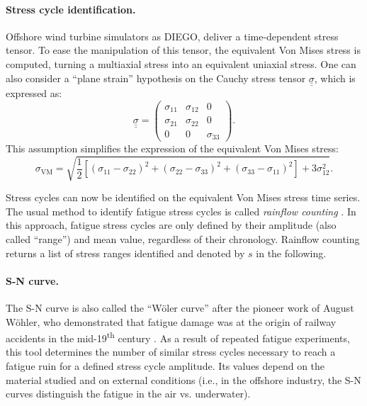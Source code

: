 \paragraph{Stress cycle identification.}
Offshore wind turbine simulators as DIEGO, deliver a time-dependent stress tensor. 
To ease the manipulation of this tensor, the equivalent Von Mises stress is computed, turning a multiaxial stress into an equivalent uniaxial stress. 
One can also consider a ``plane strain'' hypothesis on the Cauchy stress tensor $\underline{\underline{\sigma}}$, which is expressed as:
\begin{equation}
    \underline{\underline{\sigma}} = \begin{pmatrix}
                            \sigma_{11} & \sigma_{12} & 0\\
                            \sigma_{21} & \sigma_{22} & 0\\
                            0 & 0 & \sigma_{33}
                            \end{pmatrix}.
\end{equation}
This assumption simplifies the expression of the equivalent Von Mises stress: 
\begin{equation}
    \sigma _{\mathrm{VM}}=\sqrt{{\frac {1}{2}}\left[(\sigma _{11}-\sigma _{22})^{2}+(\sigma _{22}-\sigma _{33})^{2}+(\sigma _{33}-\sigma _{11})^{2}\right] + 3 \sigma _{12}^{2}}.
\end{equation}

Stress cycles can now be identified on the equivalent Von Mises stress time series. 
The usual method to identify fatigue stress cycles is called \textit{rainflow counting} \citep{dowling_1972}. 
In this approach, fatigue stress cycles are only defined by their amplitude (also called ``range'') and mean value, regardless of their chronology. 
Rainflow counting returns a list of stress ranges identified and denoted by $s$ in the following. 


\paragraph{S-N curve.}
The S-N curve is also called the ``W\"oler curve'' after the pioneer work of August W\"ohler, who demonstrated that fatigue damage was at the origin of railway accidents in the mid-19\textsuperscript{th} century \citep{schutz_1996_history_fatigue}. 
As a result of repeated fatigue experiments, this tool determines the number of similar stress cycles necessary to reach a fatigue ruin for a defined stress cycle amplitude. 
Its values depend on the material studied and on external conditions (i.e., in the offshore industry, the S-N curves distinguish the fatigue in the air vs. underwater). 

